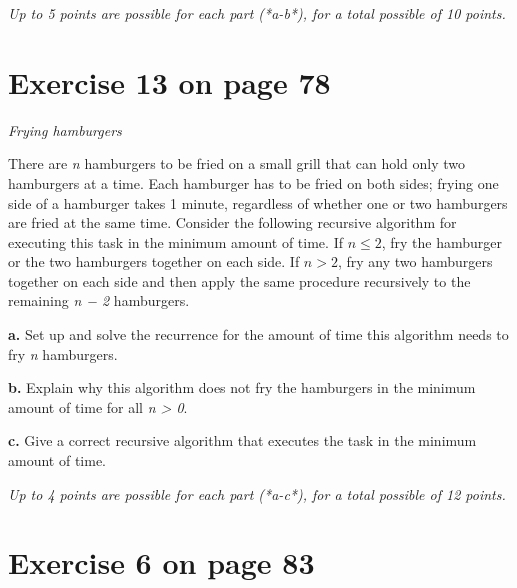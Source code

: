 \documentclass[11pt]{article}
\begin{document}
\emph{Up to 5 points are possible for each part (*a-b*), for a total possible of 10 points.}

\section*{Exercise 13 on page 78}
\label{sec-10}


\emph{Frying hamburgers}

There are \emph{n} hamburgers to be fried on a small grill that
can hold only two hamburgers at a time. Each hamburger has to be fried
on both sides; frying one side of a hamburger takes 1 minute, regardless of
whether one or two hamburgers are fried at the same time. Consider the
following recursive algorithm for executing this task in the minimum amount
of time. If \(n \le 2\), fry the hamburger or the two hamburgers together on each
side. If \(n > 2\), fry any two hamburgers together on each side and then apply
the same procedure recursively to the remaining \emph{n − 2} hamburgers.

\textbf{a.} Set up and solve the recurrence for the amount of time this algorithm needs
   to fry \emph{n} hamburgers.

\textbf{b.} Explain why this algorithm does not fry the hamburgers in the minimum
   amount of time for all \emph{n > 0}.

\textbf{c.} Give a correct recursive algorithm that executes the task in the minimum
   amount of time.

\emph{Up to 4 points are possible for each part (*a-c*), for a total possible of 12 points.}

\section*{Exercise 6 on page 83}
\label{sec-11}
\end{document}
